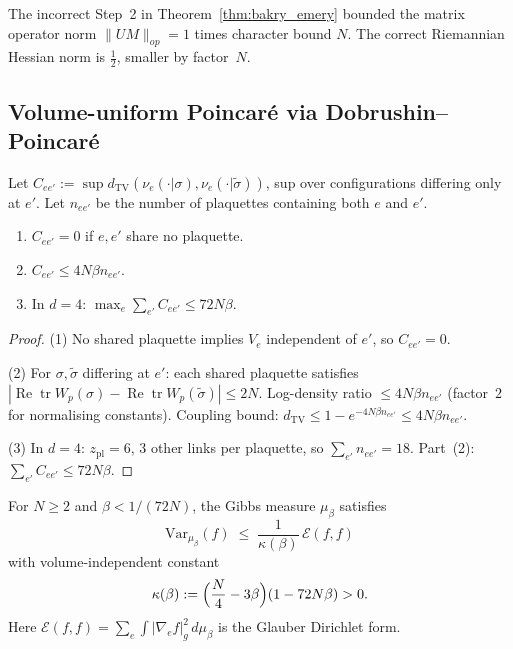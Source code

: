 \begin{remark}
The incorrect Step~2 in Theorem~\ref{thm:bakry_emery} bounded the matrix operator
norm $\|UM\|_{op}=1$ times character bound $N$.
The correct Riemannian Hessian norm is $\tfrac{1}{2}$, smaller by factor~$N$.
\end{remark}

\subsection{Volume-uniform Poincar\'{e} via Dobrushin--Poincar\'{e}}
\label{ssec:dobrushin_poincare}

\begin{lemma}
\label{lem:dobrushin_coeff}
Let $C_{ee'}:=\sup d_{\mathrm{TV}}(\nu_e(\cdot|\sigma),\nu_e(\cdot|\tilde\sigma))$,
sup over configurations differing only at $e'$.
Let $n_{ee'}$ be the number of plaquettes containing both $e$ and $e'$.
\begin{enumerate}
\item $C_{ee'}=0$ if $e,e'$ share no plaquette.
\item $C_{ee'}\le 4N\beta n_{ee'}$.
\item In $d=4$: $\max_e\sum_{e'}C_{ee'}\le 72N\beta$.
\end{enumerate}
\end{lemma}

\begin{proof}
(1) No shared plaquette implies $V_e$ independent of $e'$, so $C_{ee'}=0$.

(2) For $\sigma,\tilde\sigma$ differing at $e'$:
each shared plaquette satisfies
$|\operatorname{Re}\operatorname{tr}W_p(\sigma)-\operatorname{Re}\operatorname{tr}W_p(\tilde\sigma)|\le 2N$.
Log-density ratio $\le 4N\beta n_{ee'}$ (factor~$2$ for normalising constants).
Coupling bound: $d_{\mathrm{TV}}\le 1-e^{-4N\beta n_{ee'}}\le 4N\beta n_{ee'}$.

(3) In $d=4$: $z_{\mathrm{pl}}=6$, $3$ other links per plaquette,
so $\sum_{e'}n_{ee'}=18$.  Part~(2): $\sum_{e'}C_{ee'}\le 72N\beta$.
\end{proof}

\begin{theorem}
\label{thm:dobrushin_poincare}
For $N\ge2$ and $\beta<1/(72N)$,
the Gibbs measure $\mu_{\beta}$ satisfies
\begin{equation}
\label{eq:dp_poincare}
  \mathrm{Var}_{\mu_{\beta}}(f)\;\le\;\frac{1}{\kappa(\beta)}\,\mathcal{E}(f,f)
\end{equation}
with volume-independent constant
\begin{equation}
\label{eq:kappa_def}
  \kappa(\beta):=\Bigl(\frac{N}{4}-3\beta\Bigr)(1-72N\beta)>0.
\end{equation}
Here $\mathcal{E}(f,f)=\sum_{e}\int|\nabla_e f|_g^2\,d\mu_{\beta}$ is the Glauber Dirichlet form.
\end{theorem}

